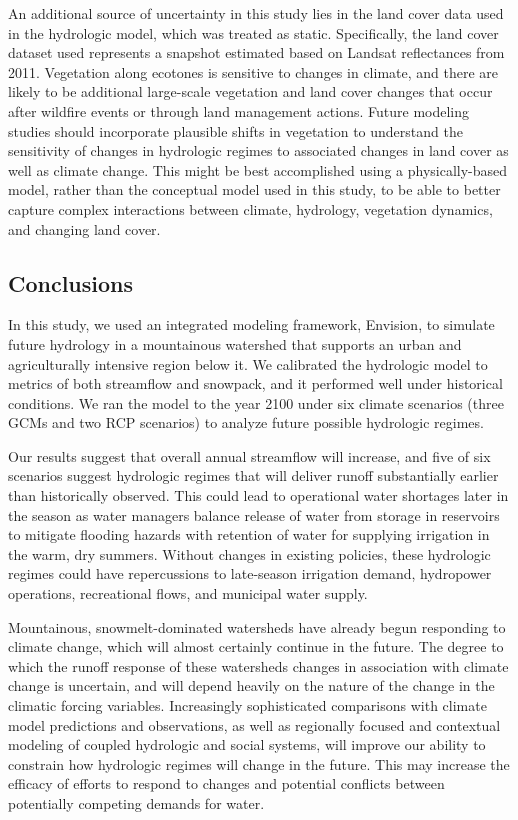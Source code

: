 \documentclass[water,article,submit,moreauthors,pdftex,10pt,a4paper]{mdpi}
\theoremstyle{mdpi}
\newcounter{ex}
\newcounter{re}
\theoremstyle{mdpidefinition}
\begin{document}
An additional source of uncertainty in this study lies in the land cover data used in the hydrologic model, which was treated as static. Specifically, the land cover dataset used represents a snapshot estimated based on Landsat reflectances from 2011. Vegetation along ecotones is sensitive to changes in climate, and there are likely to be additional large-scale vegetation and land cover changes that occur after wildfire events or through land management actions. Future modeling studies should incorporate plausible shifts in vegetation to understand the sensitivity of changes in hydrologic regimes to associated changes in land cover as well as climate change. This might be best accomplished using a physically-based model, rather than the conceptual model used in this study, to be able to better capture complex interactions between climate, hydrology, vegetation dynamics, and changing land cover.


\subsection{Conclusions}

In this study, we used an integrated modeling framework, Envision, to simulate future hydrology in a mountainous watershed that supports an urban and agriculturally intensive region below it. We calibrated the hydrologic model to metrics of both streamflow and snowpack, and it performed well under historical conditions. We ran the model to the year 2100 under six climate scenarios (three GCMs and two RCP scenarios) to analyze future possible hydrologic regimes. 

Our results suggest that overall annual streamflow will increase, and five of six scenarios suggest hydrologic regimes that will deliver runoff substantially earlier than historically observed. This could lead to operational water shortages later in the season as water managers balance release of water from storage in reservoirs to mitigate flooding hazards with retention of water for supplying irrigation in the warm, dry summers. Without changes in existing policies, these hydrologic regimes could have repercussions to late-season irrigation demand, hydropower operations, recreational flows, and municipal water supply. 

Mountainous, snowmelt-dominated watersheds have already begun responding to climate change, which will almost certainly continue in the future. The degree to which the runoff response of these watersheds changes in association with climate change is uncertain, and will depend heavily on the nature of the change in the climatic forcing variables. Increasingly sophisticated comparisons with climate model predictions and observations, as well as regionally focused and contextual modeling of coupled hydrologic and social systems, will improve our ability to constrain how hydrologic regimes will change in the future. This may increase the efficacy of efforts to respond to changes and potential conflicts between potentially competing demands for water.
\end{document}
